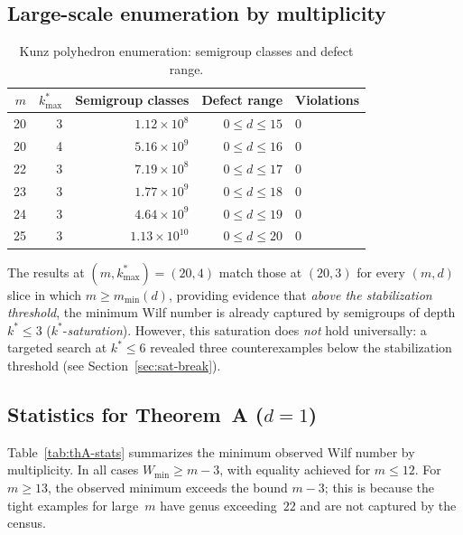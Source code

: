 \documentclass[11pt]{amsart}
\theoremstyle{definition}
\theoremstyle{remark}
\begin{document}
\subsection{Large-scale enumeration by multiplicity}

\begin{table}[ht]
\centering
\caption{Kunz polyhedron enumeration: semigroup classes and defect range.}\label{tab:kunz-enum}
\begin{tabular}{rrrrl}
\toprule
$m$ & $k^*_{\max}$ & Semigroup classes & Defect range & Violations \\
\midrule
20 & 3 & $1.12 \times 10^{8}$ & $0 \le d \le 15$ & 0 \\
20 & 4 & $5.16 \times 10^{9}$ & $0 \le d \le 16$ & 0 \\
22 & 3 & $7.19 \times 10^{8}$ & $0 \le d \le 17$ & 0 \\
23 & 3 & $1.77 \times 10^{9}$ & $0 \le d \le 18$ & 0 \\
24 & 3 & $4.64 \times 10^{9}$ & $0 \le d \le 19$ & 0 \\
25 & 3 & $1.13 \times 10^{10}$ & $0 \le d \le 20$ & 0 \\
\bottomrule
\end{tabular}
\end{table}

The results at $(m, k^*_{\max}) = (20, 4)$ match those at $(20, 3)$ for every
$(m,d)$ slice in which $m \ge m_{\min}(d)$, providing evidence that
\emph{above the stabilization threshold}, the minimum Wilf number is already
captured by semigroups of depth~$k^* \le 3$ ($k^*$-\emph{saturation}).
However, this saturation does \emph{not} hold universally:
a targeted search at $k^* \le 6$ revealed three counterexamples
below the stabilization threshold (see Section~\ref{sec:sat-break}).

\subsection{Statistics for Theorem~A ($d=1$)}

Table~\ref{tab:thA-stats} summarizes the minimum observed Wilf number
by multiplicity.  In all cases $W_{\min} \ge m - 3$, with equality achieved
for $m \le 12$.  For $m \ge 13$, the observed minimum exceeds the bound
$m - 3$; this is because the tight examples for large~$m$ have genus
exceeding~$22$ and are not captured by the census.
\end{document}
